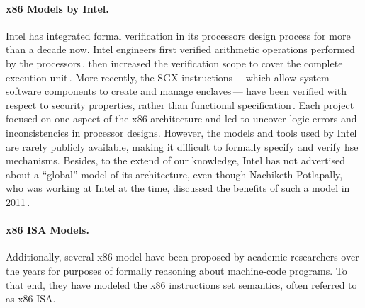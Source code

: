 \paragraph{x86 Models by Intel.}
%
Intel has integrated formal verification in its processors design process for
more than a decade now.
%
Intel engineers first verified arithmetic operations performed by the
processors\,\cite{harrison2000x86}, then increased the verification scope to
cover the complete execution unit\,\cite{kaivola2009formalintel}.
%
More recently, the SGX instructions ---which allow system software components to
create and manage enclaves\,\cite{costan2016sgxexplained}--- have been verified
with respect to security properties, rather than functional
specification\,\cite{leslie2015linsgx}.
%
Each project focused on one aspect of the x86 architecture and led to uncover
logic errors and inconsistencies in processor designs.
%
However, the models and tools used by Intel are rarely publicly available,
making it difficult to formally specify and verify \ac{hse}
mechanisms. 
%
Besides, to the extend of our knowledge, Intel has not advertised about a
``global'' model of its architecture, even though Nachiketh Potlapally, who was
working at Intel at the time, discussed the benefits of such a model in
2011\,\cite{potlapally2011hardwaresecurity}. 

\paragraph{x86 ISA Models.}
%
Additionally, several x86 model have been proposed by academic researchers over
the years for purposes of formally reasoning about machine-code programs.
%
To that end, they have modeled the x86 instructions set semantics, often
referred to as x86 ISA.

